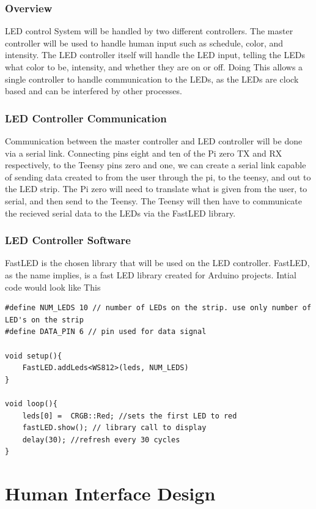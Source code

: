 \documentclass[onecolumn, draftclsnofoot,10pt, compsoc]{IEEEtran}
\begin{document}
			\subsubsection{Overview}
				\noindent LED control System will be handled by two different controllers. The master controller will be used to handle human input such
				as schedule, color, and intensity. The LED controller itself will handle the LED input, telling the LEDs what color to be,
				intensity, and whether they are on or off. Doing This allows a single controller to handle communication to the LEDs, as the
				LEDs are clock based and can be interfered by other processes\cite{fastLED}.
				\subsubsection{LED Controller Communication}
				\noindent Communication between the master controller and LED controller will be done via a serial link.
				Connecting pins eight and ten of the Pi zero TX and RX respectively, to the Teensy pins zero and one, we can create a serial link
				capable of sending data created to from the user through the pi, to the teensy, and out to the LED strip.
				The Pi zero will need to translate what is given from the user, to serial, and then send to the Teensy. The Teensy will then have to communicate
				the recieved serial data to the LEDs via the FastLED library.
				\subsubsection{LED Controller Software}
				\noindent FastLED is the chosen library that will be used on the LED controller.
				FastLED, as the name implies, is a fast LED library created for Arduino projects.
				Intial code would look like This

			\begin{lstlisting}
#define NUM_LEDS 10 // number of LEDs on the strip. use only number of LED's on the strip
#define DATA_PIN 6 // pin used for data signal

void setup(){
	FastLED.addLeds<WS812>(leds, NUM_LEDS)
}

void loop(){
	leds[0] =  CRGB::Red; //sets the first LED to red
	fastLED.show(); // library call to display
	delay(30); //refresh every 30 cycles
}

		\end{lstlisting}

			\section{Human Interface Design}
\end{document}
